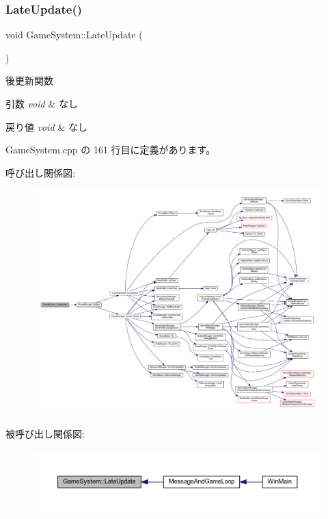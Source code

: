 \subsubsection{\texorpdfstring{Late\+Update()}{LateUpdate()}}
{\footnotesize\ttfamily void Game\+System\+::\+Late\+Update (\begin{DoxyParamCaption}{ }\end{DoxyParamCaption})}



後更新関数 


\begin{DoxyParams}{引数}
{\em void} & なし \\
\hline
\end{DoxyParams}

\begin{DoxyRetVals}{戻り値}
{\em void} & なし \\
\hline
\end{DoxyRetVals}


 Game\+System.\+cpp の 161 行目に定義があります。

呼び出し関係図\+:
\nopagebreak
\begin{figure}[H]
\begin{center}
\leavevmode
\includegraphics[width=350pt]{class_game_system_aa416827abc995e1b8df4a5cf87911baf_cgraph}
\end{center}
\end{figure}
被呼び出し関係図\+:
\nopagebreak
\begin{figure}[H]
\begin{center}
\leavevmode
\includegraphics[width=350pt]{class_game_system_aa416827abc995e1b8df4a5cf87911baf_icgraph}
\end{center}
\end{figure}
\mbox{\label{class_game_system_af76866bd03b84dca6880f1493fd3c9d1}} 
